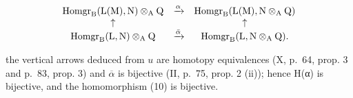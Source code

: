 \[
\begin{array}{c c c} \operatorname{Homgr} _ {\mathrm{B}} (\mathrm{L} (\mathrm{M}), \mathrm{N}) \otimes_ {\mathrm{A}} \mathrm{Q} & \xrightarrow {\alpha} & \operatorname{Homgr} _ {\mathrm{B}} (\mathrm{L} (\mathrm{M}), \mathrm{N} \otimes_ {\mathrm{A}} \mathrm{Q}) \\ \uparrow & & \uparrow \\ \operatorname{Homgr} _ {\mathrm{B}} (\mathrm{L}, \mathrm{N}) \otimes_ {\mathrm{A}} \mathrm{Q} & \xrightarrow {\bar {\alpha}} & \operatorname{Homgr} _ {\mathrm{B}} (\mathrm{L}, \mathrm{N} \otimes_ {\mathrm{A}} \mathrm{Q}). \end{array}
\]

the vertical arrows deduced from \(u\) are homotopy equivalences (X, p.~64, prop. 3 and p.~83, prop. 3) and \(\overline{\alpha}\) is bijective (II, p.~75, prop. 2 (ii)); hence H(α) is bijective, and the homomorphism (10) is bijective.

